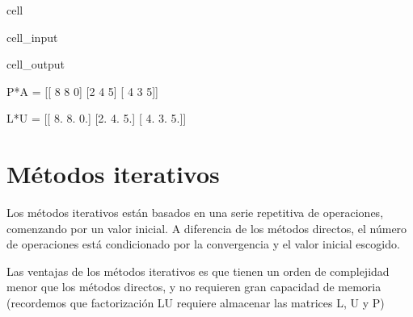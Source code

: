 \documentclass[letterpaper,10pt,english]{jupyterBook}
\begin{document}
\begin{sphinxuseclass}{cell}\begin{sphinxVerbatimInput}

\begin{sphinxuseclass}{cell_input}
\begin{sphinxVerbatim}[commandchars=\\\{\}]
\end{sphinxVerbatim}

\end{sphinxuseclass}\end{sphinxVerbatimInput}
\begin{sphinxVerbatimOutput}

\begin{sphinxuseclass}{cell_output}
\begin{sphinxVerbatim}[commandchars=\\\{\}]
P*A =
 [[ 8  8  0]
 [\PYGZhy{}2 \PYGZhy{}4  5]
 [ 4  3 \PYGZhy{}5]]


L*U =
 [[ 8.  8.  0.]
 [\PYGZhy{}2. \PYGZhy{}4.  5.]
 [ 4.  3. \PYGZhy{}5.]]
\end{sphinxVerbatim}

\end{sphinxuseclass}\end{sphinxVerbatimOutput}

\end{sphinxuseclass}

\section{Métodos iterativos}
\label{\detokenize{1.2-Algebra_lineal/1.2-Algebra_lineal:metodos-iterativos}}
\sphinxAtStartPar
Los métodos iterativos están basados en una serie repetitiva de operaciones, comenzando por un valor inicial. A diferencia de los métodos directos, el número de operaciones está condicionado por la convergencia y el valor inicial escogido.

\sphinxAtStartPar
Las ventajas de los métodos iterativos es que tienen un orden de complejidad menor que los métodos directos, y no requieren gran capacidad de memoria (recordemos que factorización LU requiere almacenar las matrices L, U y P)
\end{document}
